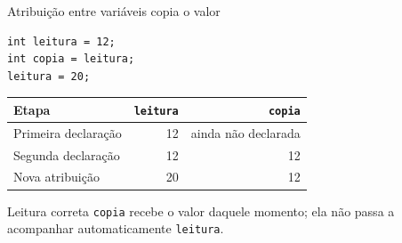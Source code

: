 \begin{frame}[fragile]{Atribuição entre variáveis copia o valor}
\begin{lstlisting}
int leitura = 12;
int copia = leitura;
leitura = 20;
\end{lstlisting}
\begin{center}
\begin{tabular}{lrr}
\toprule
Etapa & \texttt{leitura} & \texttt{copia} \\
\midrule
Primeira declaração & 12 & ainda não declarada \\
Segunda declaração & 12 & 12 \\
Nova atribuição & 20 & 12 \\
\bottomrule
\end{tabular}
\end{center}
\begin{block}{Leitura correta}
\texttt{copia} recebe o valor daquele momento; ela não passa a acompanhar automaticamente \texttt{leitura}.
\end{block}
\end{frame}
